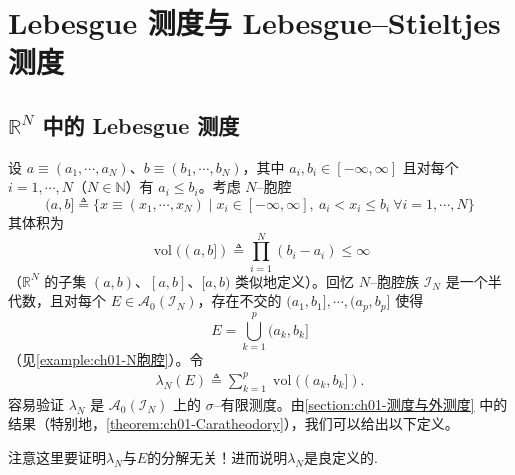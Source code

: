 \documentclass[../../main.tex]{subfiles}%
\begin{document}
\section{Lebesgue 测度与 Lebesgue--Stieltjes 测度}\label{section:ch01-Lebesgue}

\subsection{$\mathbb{R}^N$ 中的 Lebesgue 测度}\label{subsection:ch01-Lebesgue测度}

设 $a\equiv(a_1,\cdots ,a_N)$、$b\equiv(b_1,\cdots ,b_N)$，其中 $a_i,b_i\in[-\infty,\infty]$ 且对每个 $i=1,\cdots ,N$（$N\in\mathbb{N}$）有 $a_i\leqslant b_i$。考虑 $N$--胞腔
\[
(a,b]\triangleq \{x\equiv(x_1,\cdots ,x_N)\mid x_i\in[-\infty,\infty],\ a_i<x_i\leqslant b_i\ \forall i=1,\cdots ,N\}
\]
其体积为
\[
\operatorname{vol}((a,b])\triangleq \prod_{i=1}^N(b_i-a_i)\leqslant\infty
\]
（$\mathbb{R}^N$ 的子集 $(a,b)$、$[a,b]$、$[a,b)$ 类似地定义）。回忆 $N$--胞腔族 $\mathcal{I}_N$ 是一个半代数，且对每个 $E\in\mathcal{A}_0(\mathcal{I}_N)$，存在不交的 $(a_1,b_1],\cdots ,(a_p,b_p]$ 使得
\[
E=\bigcup_{k=1}^p(a_k,b_k]
\]
（见\cref{example:ch01-N胞腔}）。令
\begin{align}
\lambda_N(E)\triangleq \sum_{k=1}^p\operatorname{vol}((a_k,b_k]). \label{align:ch01-lambdaN定义}
\end{align}
容易验证 $\lambda_N$ 是 $\mathcal{A}_0(\mathcal{I}_N)$ 上的 $\sigma$--有限测度。由\cref{section:ch01-测度与外测度} 中的结果（特别地，\cref{theorem:ch01-Caratheodory}），我们可以给出以下定义。

\begin{remark}
注意这里要证明$\lambda_N$与$E$的分解无关！进而说明$\lambda_N$是良定义的.
\end{remark}
\end{document}
